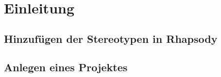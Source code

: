 \chapter{Einleitung}

\section{Hinzufügen der Stereotypen in Rhapsody}

\section{Anlegen eines Projektes}